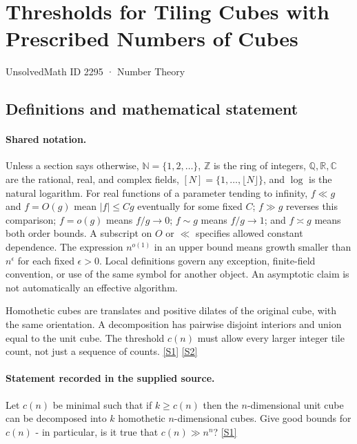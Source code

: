 \documentclass[11pt,a4paper]{article}
\newcommand{\N}{\mathbb{N}}
\newcommand{\Z}{\mathbb{Z}}
\newcommand{\Q}{\mathbb{Q}}
\newcommand{\R}{\mathbb{R}}
\newcommand{\C}{\mathbb{C}}
\newcommand{\sref}[2]{\hyperlink{source:#1:#2}{[S#2]}}
\begin{document}

\setcounter{section}{2294}

\section{Thresholds for Tiling Cubes with Prescribed Numbers of Cubes}\label{2295}

{\small\sffamily UnsolvedMath ID 2295 · Number Theory}

\subsection{Definitions and mathematical statement}

\paragraph{Shared notation.}Unless a section says otherwise, $\N=\{1,2,\ldots\}$,
$\Z$ is the ring of integers, $\Q,\R,\C$ are the rational, real, and complex
fields, $[N]=\{1,\ldots,\lfloor N\rfloor\}$, and $\log$ is the natural
logarithm. For real functions of a parameter tending to infinity,
$f\ll g$ and $f=O(g)$ mean $|f|\leq Cg$ eventually for some fixed $C$;
$f\gg g$ reverses this comparison; $f=o(g)$ means $f/g\to0$;
$f\sim g$ means $f/g\to1$; and $f\asymp g$ means both order bounds.
A subscript on $O$ or $\ll$ specifies allowed constant dependence.
The expression $n^{o(1)}$ in an upper bound means growth smaller than
$n^\epsilon$ for each fixed $\epsilon>0$. Local definitions govern any
exception, finite-field convention, or use of the same symbol for another
object. An asymptotic claim is not automatically an effective algorithm.



Homothetic cubes are translates and positive dilates of the original cube, with the same orientation. A decomposition has pairwise disjoint interiors and union equal to the unit cube. The threshold $c(n)$ must allow every larger integer tile count, not just a sequence of counts. \sref{2295}{1} \sref{2295}{2}

\paragraph{Statement recorded in the supplied source.}
Let $c(n)$ be minimal such that if $k\geq c(n)$ then the $n$-dimensional unit cube can be decomposed into $k$ homothetic $n$-dimensional cubes. Give good bounds for $c(n)$ - in particular, is it true that $c(n) \gg n^n$? \sref{2295}{1}
\end{document}
